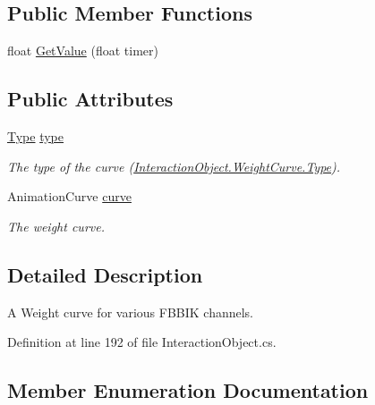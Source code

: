 \subsection*{Public Member Functions}
\begin{DoxyCompactItemize}
\item 
float \mbox{\hyperlink{class_root_motion_1_1_final_i_k_1_1_interaction_object_1_1_weight_curve_a6e46319f320c6dd19b6571ed04911f06}{Get\+Value}} (float timer)
\end{DoxyCompactItemize}
\subsection*{Public Attributes}
\begin{DoxyCompactItemize}
\item 
\mbox{\hyperlink{class_root_motion_1_1_final_i_k_1_1_interaction_object_1_1_weight_curve_a74c8be2e80ace86b130c88e275300b27}{Type}} \mbox{\hyperlink{class_root_motion_1_1_final_i_k_1_1_interaction_object_1_1_weight_curve_ad9e0fc4c086fd89f5d00c360499258fb}{type}}
\begin{DoxyCompactList}\small\item\em The type of the curve (\mbox{\hyperlink{class_root_motion_1_1_final_i_k_1_1_interaction_object_1_1_weight_curve_a74c8be2e80ace86b130c88e275300b27}{Interaction\+Object.\+Weight\+Curve.\+Type}}). \end{DoxyCompactList}\item 
Animation\+Curve \mbox{\hyperlink{class_root_motion_1_1_final_i_k_1_1_interaction_object_1_1_weight_curve_afd6f09122f7b21911039b287b14a18b0}{curve}}
\begin{DoxyCompactList}\small\item\em The weight curve. \end{DoxyCompactList}\end{DoxyCompactItemize}


\subsection{Detailed Description}
A Weight curve for various F\+B\+B\+IK channels. 



Definition at line 192 of file Interaction\+Object.\+cs.



\subsection{Member Enumeration Documentation}
\mbox{\label{class_root_motion_1_1_final_i_k_1_1_interaction_object_1_1_weight_curve_a74c8be2e80ace86b130c88e275300b27}} 
